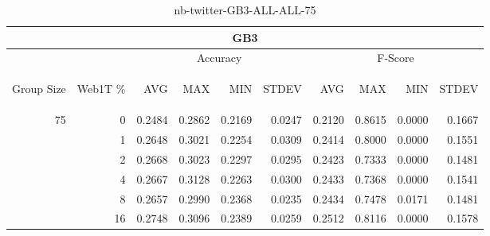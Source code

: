 \begin{center}
\begin{table}[htbp]
\begin{center}
\begin{tabular}{ | r | r | r | r | r | r | r | r | r | r |}
\hline
\multicolumn{10}{|c|}{GB3}\\
\hline
 & & \multicolumn{4}{|c|}{Accuracy} & \multicolumn{4}{|c|}{F-Score}\\ \cline{3-10}
\begin{sideways}Group Size\end{sideways} & \begin{sideways}Web1T \%\end{sideways} & \begin{sideways}AVG\end{sideways} & \begin{sideways}MAX\end{sideways} & \begin{sideways}MIN\end{sideways} & \begin{sideways}STDEV\end{sideways} & \begin{sideways}AVG\end{sideways} & \begin{sideways}MAX\end{sideways} & \begin{sideways}MIN\end{sideways} & \begin{sideways}STDEV\end{sideways}\\
\hline
\multirow{5}{*}{75}
 & 0 & 0.2484 & 0.2862 & 0.2169 & 0.0247 & 0.2120 & 0.8615 & 0.0000 & 0.1667\\ \cline{2-10}
 & 1 & 0.2648 & 0.3021 & 0.2254 & 0.0309 & 0.2414 & 0.8000 & 0.0000 & 0.1551\\ \cline{2-10}
 & 2 & 0.2668 & 0.3023 & 0.2297 & 0.0295 & 0.2423 & 0.7333 & 0.0000 & 0.1481\\ \cline{2-10}
 & 4 & 0.2667 & 0.3128 & 0.2263 & 0.0300 & 0.2433 & 0.7368 & 0.0000 & 0.1541\\ \cline{2-10}
 & 8 & 0.2657 & 0.2990 & 0.2368 & 0.0235 & 0.2434 & 0.7478 & 0.0171 & 0.1481\\ \cline{2-10}
 & 16 & 0.2748 & 0.3096 & 0.2389 & 0.0259 & 0.2512 & 0.8116 & 0.0000 & 0.1578\\ \cline{2-10}
\hline
\end{tabular}
\caption{nb-twitter-GB3-ALL-ALL-75}
\label{table:nb-twitter-GB3-ALL-ALL-75}
\end{center}
\end{table}
\end{center}

